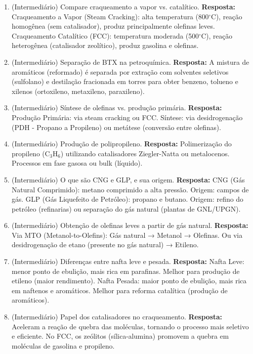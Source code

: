 \documentclass[11pt,a4paper]{article}
\begin{document}
\begin{enumerate}
  \item (Intermediário) Compare craqueamento a vapor vs. catalítico.
  \textbf{Resposta:} Craqueamento a Vapor (Steam Cracking): alta temperatura (800$^\circ$C), reação homogênea (sem catalisador), produz principalmente olefinas leves. Craqueamento Catalítico (FCC): temperatura moderada (500$^\circ$C), reação heterogênea (catalisador zeolítico), produz gasolina e olefinas.

  \item (Intermediário) Separação de BTX na petroquímica.
  \textbf{Resposta:} A mistura de aromáticos (reformado) é separada por extração com solventes seletivos (sulfolano) e destilação fracionada em torres para obter benzeno, tolueno e xilenos (ortoxileno, metaxileno, paraxileno).

  \item (Intermediário) Síntese de olefinas vs. produção primária.
  \textbf{Resposta:} Produção Primária: via steam cracking ou FCC. Síntese: via desidrogenação (PDH - Propano a Propileno) ou metátese (conversão entre olefinas).

  \item (Intermediário) Produção de polipropileno.
  \textbf{Resposta:} Polimerização do propileno (C$_3$H$_6$) utilizando catalisadores Ziegler-Natta ou metalocenos. Processos em fase gasosa ou bulk (líquido).

  \item (Intermediário) O que são CNG e GLP, e sua origem.
  \textbf{Resposta:} CNG (Gás Natural Comprimido): metano comprimido a alta pressão. Origem: campos de gás. GLP (Gás Liquefeito de Petróleo): propano e butano. Origem: refino do petróleo (refinarias) ou separação do gás natural (plantas de GNL/UPGN).

  \item (Intermediário) Obtenção de olefinas leves a partir de gás natural.
  \textbf{Resposta:} Via MTO (Metanol-to-Olefins): Gás natural → Metanol → Olefinas. Ou via desidrogenação de etano (presente no gás natural) → Etileno.

  \item (Intermediário) Diferenças entre nafta leve e pesada.
  \textbf{Resposta:} Nafta Leve: menor ponto de ebulição, mais rica em parafinas. Melhor para produção de etileno (maior rendimento). Nafta Pesada: maior ponto de ebulição, mais rica em naftenos e aromáticos. Melhor para reforma catalítica (produção de aromáticos).

  \item (Intermediário) Papel dos catalisadores no craqueamento.
  \textbf{Resposta:} Aceleram a reação de quebra das moléculas, tornando o processo mais seletivo e eficiente. No FCC, os zeólitos (sílica-alumina) promovem a quebra em moléculas de gasolina e propileno.


\end{enumerate}
\end{document}
